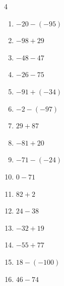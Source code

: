 \begin{multicols}{4}
\begin{enumerate}
        \phantom{$=-127$}

  \item $-20-(-95)$

        \phantom{$=75$}

  \item $-98+29$

        \phantom{$=-69$}

  \item $-48-47$

        \phantom{$=-95$}

  \item $-26-75$

        \phantom{$=-101$}

  \item $-91+(-34)$

        \phantom{$=-125$}

  \item $-2-(-97)$

        \phantom{$=95$}

  \item $29+87$

        \phantom{$=116$}

  \item $-81+20$

        \phantom{$=-61$}

  \item $-71-(-24)$

        \phantom{$=-47$}

  \item $0-71$

        \phantom{$=-71$}

  \item $82+2$

        \phantom{$=84$}

  \item $24-38$

        \phantom{$=-14$}

  \item $-32+19$

        \phantom{$=-13$}

  \item $-55+77$

        \phantom{$=22$}

  \item $18-(-100)$

        \phantom{$=118$}

  \item $46-74$


\end{enumerate}
\end{multicols}
